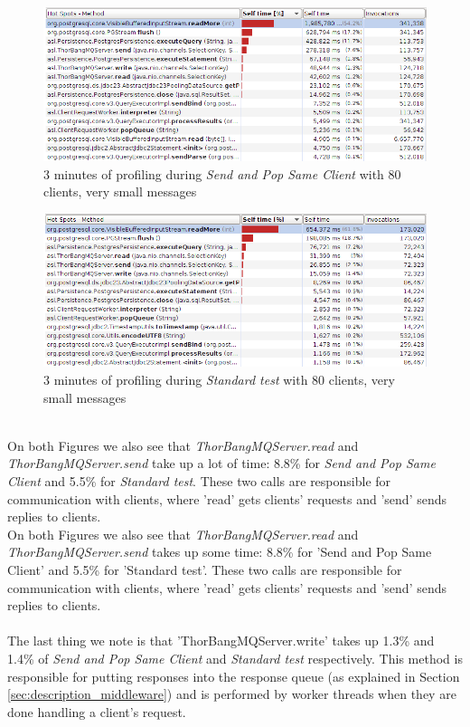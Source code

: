 \documentclass{article}
\begin{document}
            \begin{figure}[H]
                \hspace{-1.5cm}
                \centerline{\includegraphics[scale=0.50]{code_profiling_send_pop_same_client}}
                \caption{3 minutes of profiling during \textit{Send and Pop Same Client} with 80 clients, very small messages}
                \label{fig:code_profiling_send_pop_same_client}
            \end{figure}
            \begin{figure}[H]
                \hspace{-1.5cm}
                \centerline{\includegraphics[scale=0.50]{code_profiling_standard_test}}
                \caption{3 minutes of profiling during \textit{Standard test} with 80 clients, very small messages}
                \label{fig:code_profiling_standard_test}
            \end{figure}
            ~\\
            On both Figures we also see that \textit{ThorBangMQServer.read} and \textit{ThorBangMQServer.send} take up a lot of time: 8.8\% for \textit{Send and Pop Same Client} and 5.5\% for \textit{Standard test}. These two calls are responsible for communication with clients, where 'read' gets clients' requests and 'send' sends replies to clients.\\
            On both Figures we also see that \textit{ThorBangMQServer.read} and \textit{ThorBangMQServer.send} takes up some time: 8.8\% for 'Send and Pop Same Client' and 5.5\% for 'Standard test'. These two calls are responsible for communication with clients, where 'read' gets clients' requests and 'send' sends replies to clients.\\
            \\
            The last thing we note is that 'ThorBangMQServer.write' takes up 1.3\% and 1.4\% of \textit{Send and Pop Same Client} and \textit{Standard test} respectively. This method is responsible for putting responses into the response queue (as explained in Section \ref{sec:description_middleware}) and is performed by worker threads when they are done handling a client's request.
\end{document}
